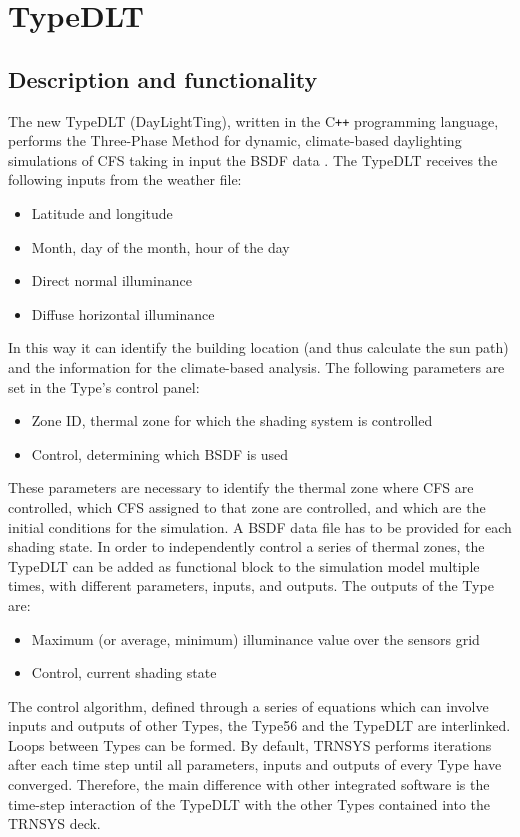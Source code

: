\chapter{TypeDLT}
\section{Description and functionality}
The new TypeDLT (DayLightTing), written in the C\texttt{++} programming language, performs the Three-Phase Method for dynamic, climate-based daylighting simulations of CFS taking in input the BSDF data \cite{bsa}.
The TypeDLT receives the following inputs from the weather file:
\begin{itemize}
\renewcommand{\labelitemi}{\tiny$\blacksquare$}
\item Latitude and longitude
\item Month, day of the month, hour of the day
\item Direct normal illuminance
\item Diffuse horizontal illuminance
\end{itemize}
In this way it can identify the building location (and thus calculate the sun path) and the information for the climate-based analysis. The following parameters are set in the Type's control panel:
\begin{itemize}
\renewcommand{\labelitemi}{\tiny$\blacksquare$}
\item Zone ID, thermal zone for which the shading system is controlled
\item Control, determining which BSDF is used
\end{itemize}
These parameters are necessary to identify the thermal zone where CFS are controlled, which CFS assigned to that zone are controlled, and which are the initial conditions for the simulation. A BSDF data file has to be provided for each shading state. In order to independently control a series of thermal zones, the TypeDLT can be added as functional block to the simulation model multiple times, with different parameters, inputs, and outputs.
The outputs of the Type are:
\begin{itemize}
\renewcommand{\labelitemi}{\tiny$\blacksquare$}
\item Maximum (or average, minimum) illuminance value over the sensors grid
\item Control, current shading state
\end{itemize}
The control algorithm, defined through a series of equations which can involve inputs and outputs of other Types, the Type56 and the TypeDLT are interlinked. Loops between Types can be formed. By default, TRNSYS performs iterations after each time step until all parameters, inputs and outputs of every Type have converged. Therefore, the main difference with other integrated software is the time-step interaction of the TypeDLT with the other Types contained into the TRNSYS deck. \\
